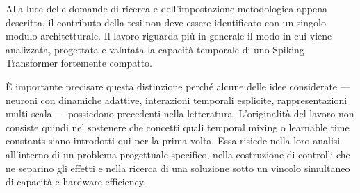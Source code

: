 Alla luce delle domande di ricerca e dell'impostazione metodologica appena descritta, il contributo della tesi non deve essere identificato con un singolo modulo architetturale. Il lavoro riguarda più in generale il modo in cui viene analizzata, progettata e valutata la capacità temporale di uno Spiking Transformer fortemente compatto.

È importante precisare questa distinzione perché alcune delle idee considerate --- neuroni con dinamiche adattive, interazioni temporali esplicite, rappresentazioni multi-scala --- possiedono precedenti nella letteratura. L'originalità del lavoro non consiste quindi nel sostenere che concetti quali temporal mixing o learnable time constants siano introdotti qui per la prima volta. Essa risiede nella loro analisi all'interno di un problema progettuale specifico, nella costruzione di controlli che ne separino gli effetti e nella ricerca di una soluzione sotto un vincolo simultaneo di capacità e hardware efficiency.


